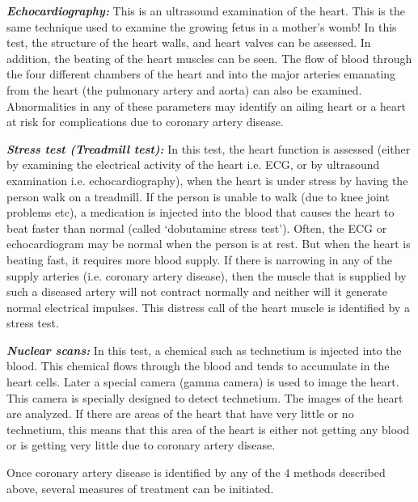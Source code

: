 { \item \textbf{\textit{Echocardiography:}} This is an ultrasound examination of the heart. This is the same technique used to examine the growing fetus in a mother’s womb! In this test, the structure of the heart walls, and heart valves can be assessed. In addition, the beating of the heart muscles can be seen. The flow of blood through the four different chambers of the heart and into the major arteries emanating from the heart (the pulmonary artery and aorta) can also be examined. Abnormalities in any of these parameters may identify an ailing heart or a heart at risk for complications due to coronary artery disease.

 \item \textbf{\textit{Stress test (Treadmill test):}} In this test, the heart function is assessed (either by examining the electrical activity of the heart i.e. ECG, or by ultrasound examination i.e. echocardiography), when the heart is under stress by having the person walk on a treadmill. If the person is unable to walk (due to knee joint problems etc), a medication is injected into the blood that causes the heart to beat faster than normal (called ‘dobutamine stress test’). Often, the ECG or echocardiogram may be normal when the person is at rest. But when the heart is beating fast, it requires more blood supply. If there is narrowing in any of the supply arteries (i.e. coronary artery disease), then the muscle that is supplied by such a diseased artery will not contract normally and neither will it generate normal electrical impulses. This distress call of the heart muscle is identified by a stress test.

 \item \textbf{\textit{Nuclear scans:}} In this test, a chemical such as technetium is injected into the blood. This chemical flows through the blood and tends to accumulate in the heart cells. Later a special camera (gamma camera) is used to image the heart. This camera is specially designed to detect technetium. The images of the heart are analyzed. If there are areas of the heart that have very little or no technetium, this means that this area of the heart is either not getting any blood or is getting very little due to coronary artery disease.

Once coronary artery disease is identified by any of the 4 methods described above, several measures of treatment can be initiated.


}
